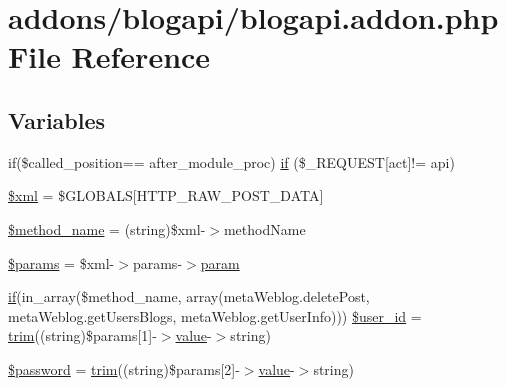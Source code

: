 \hypertarget{blogapi_8addon_8php}{}\section{addons/blogapi/blogapi.addon.\+php File Reference}
\label{blogapi_8addon_8php}
\subsection*{Variables}
\begin{DoxyCompactItemize}
\item 
if(\$called\+\_\+position== \textquotesingle{}after\+\_\+module\+\_\+proc\textquotesingle{}) \hyperlink{blogapi_8addon_8php_ae00067f6d78515f89a86a2a7f42cdc80}{if} (\$\+\_\+\+R\+E\+Q\+U\+E\+ST\mbox{[}\textquotesingle{}act\textquotesingle{}\mbox{]}!= \textquotesingle{}api\textquotesingle{})
\item 
\hyperlink{blogapi_8addon_8php_aa108d9d91e700ac530401dd363b0723b}{\$xml} = \$G\+L\+O\+B\+A\+LS\mbox{[}\textquotesingle{}H\+T\+T\+P\+\_\+\+R\+A\+W\+\_\+\+P\+O\+S\+T\+\_\+\+D\+A\+TA\textquotesingle{}\mbox{]}
\item 
\hyperlink{blogapi_8addon_8php_a88c34f4701e451bbcef63e44e5902ebd}{\$method\+\_\+name} = (string)\$xml-\/$>$method\+Name
\item 
\hyperlink{blogapi_8addon_8php_afe68e6fbe7acfbffc0af0c84a1996466}{\$params} = \$xml-\/$>$params-\/$>$\hyperlink{jquery-1_8x_8min_8js_ae8915303d11557d1b001bc56b6195251}{param}
\item 
\hyperlink{menu_2tpl_2js_2jquery_8jstree_8js_acba95bef569cfaee32c4ed0212b2bb92}{if}(in\+\_\+array(\$method\+\_\+name, array(\textquotesingle{}meta\+Weblog.\+delete\+Post\textquotesingle{}, \textquotesingle{}meta\+Weblog.\+get\+Users\+Blogs\textquotesingle{}, \textquotesingle{}meta\+Weblog.\+get\+User\+Info\textquotesingle{}))) \hyperlink{blogapi_8addon_8php_a6d0a036129b3030ce289a026c5e1eff2}{\$user\+\_\+id} = \hyperlink{common_8js_aa2a2da3bb0be9a135cfe2898cb9aa8bc}{trim}((string)\$params\mbox{[}1\mbox{]}-\/$>$\hyperlink{common_2js_2jquery_8js_abe5393d870043cf6aaa1d5ad5fce755c}{value}-\/$>$string)
\item 
\hyperlink{blogapi_8addon_8php_a607686ef9f99ea7c42f4f3dd3dbb2b0d}{\$password} = \hyperlink{common_8js_aa2a2da3bb0be9a135cfe2898cb9aa8bc}{trim}((string)\$params\mbox{[}2\mbox{]}-\/$>$\hyperlink{common_2js_2jquery_8js_abe5393d870043cf6aaa1d5ad5fce755c}{value}-\/$>$string)
\end{DoxyCompactItemize}


